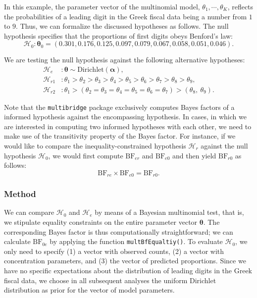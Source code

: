 \documentclass[
  english,
  man,floatsintext]{apa6}
\begin{document}
In this example, the parameter vector of the multinomial model, \(\theta_1, \cdots, \theta_K\), reflects the probabilities of a leading digit in the Greek fiscal data being a number from \(1\) to \(9\). Thus, we can formalize the discussed hypotheses as follows. The null hypothesis specifies that the proportions of first digits obeys Benford's law:
\[\mathcal{H}_0 : \boldsymbol{\theta}_0 = (0.301, 0.176, 0.125, 0.097, 0.079, 0.067, 0.058, 0.051, 0.046).\]

We are testing the null hypothesis against the following alternative hypotheses:
\begin{align*}
\mathcal{H}_e &: \boldsymbol{\theta} \sim \text{Dirichlet}(\boldsymbol{\alpha}), \\
\mathcal{H}_{r1} &: \theta_1 > \theta_2 > \theta_3 > \theta_4 > \theta_5 > \theta_6 > \theta_7 > \theta_8 > \theta_9, \\
\mathcal{H}_{r2} &:  \theta_1 > (\theta_2 = \theta_3 = \theta_4 = \theta_5 = \theta_6 = \theta_7) > (\theta_8, \ \theta_9).
\end{align*}

Note that the \texttt{multibridge} package exclusively computes Bayes factors of a informed hypothesis against the encompassing hypothesis. In cases, in which we are interested in computing two informed hypotheses with each other, we need to make use of the transitivity property of the Bayes factor. For instance, if we would like to compare the inequality-constrained hypothesis \(\mathcal{H}_r\) against the null hypothesis \(\mathcal{H}_0\), we would first compute \(\text{BF}_{er}\) and \(\text{BF}_{e0}\) and then yield \(\text{BF}_{r0}\) as follows:
\[\text{BF}_{re} \times \text{BF}_{e0} = \text{BF}_{r0}.\]

\hypertarget{method}{%
\subsubsection{Method}\label{method}}

We can compare \(\mathcal{H}_0\) and \(\mathcal{H}_e\) by means of a Bayesian multinomial test, that is, we stipulate equality constraints on the entire parameter vector \(\boldsymbol{\theta}\). The corresponding Bayes factor is thus computationally straightforward; we can calculate \(\text{BF}_{0e}\) by applying the function \texttt{multBfEqualtiy()}. To evaluate \(\mathcal{H}_0\), we only need to specify (1) a vector with observed counts, (2) a vector with concentration parameters, and (3) the vector of predicted proportions. Since we have no specific expectations about the distribution of leading digits in the Greek fiscal data, we choose in all subsequent analyses the uniform Dirichlet distribution as prior for the vector of model parameters.
\end{document}
